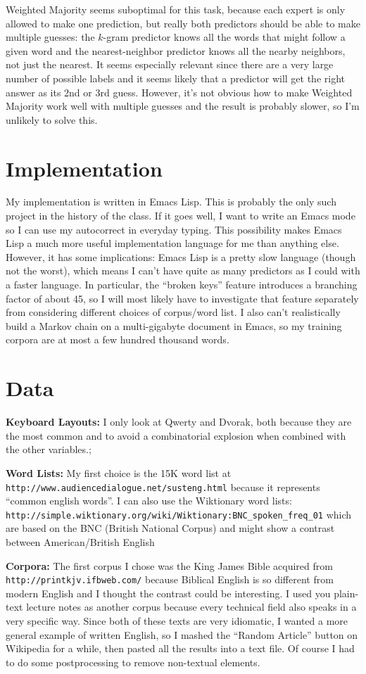 \documentclass[12pt]{article}
\begin{document}
Weighted Majority seems suboptimal for this task, because each expert
is only allowed to make one prediction, but really both predictors
should be able to make multiple guesses: the $k$-gram predictor knows
all the words that might follow a given word and the nearest-neighbor
predictor knows all the nearby neighbors, not just the nearest. It
seems especially relevant since there are a very large number of
possible labels and it seems likely that a predictor will get the
right answer as its 2nd or 3rd guess.  However, it's not obvious how
to make Weighted Majority work well with multiple guesses and the
result is probably slower, so I'm unlikely to solve this.

\section{Implementation}
My implementation is written in Emacs Lisp. This is probably the only
such project in the history of the class. If it goes well, I want to
write an Emacs mode so I can use my autocorrect in everyday
typing. This possibility makes Emacs Lisp a much more useful
implementation language for me than anything else. However, it has
some implications: Emacs Lisp is a pretty slow language (though not
the worst), which means I can't have quite as many predictors as I
could with a faster language. In particular, the ``broken keys''
feature introduces a branching factor of about 45, so I will most
likely have to investigate that feature separately from considering
different choices of corpus/word list. I also can't realistically
build a Markov chain on a multi-gigabyte document in Emacs, so my
training corpora are at most a few hundred thousand words.
\section{Data}
{\bf Keyboard Layouts:} I only look at Qwerty and Dvorak, both because
they are the most common and to avoid a combinatorial explosion when
combined with the other variables.;

{\bf Word Lists:} My first choice is the 15K word list at
\\\verb|http://www.audiencedialogue.net/susteng.html| because it
represents ``common english words''. I can also use the Wiktionary
word lists:
\\\verb|http://simple.wiktionary.org/wiki/Wiktionary:BNC_spoken_freq_01|
which are based on the BNC (British National Corpus) and might show a
contrast between American/British English

{\bf Corpora:} The first corpus I chose was the King James Bible
acquired from \verb|http://printkjv.ifbweb.com/| because Biblical
English is so different from modern English and I thought the contrast
could be interesting.  I used you plain-text lecture notes as another
corpus because every technical field also speaks in a very specific
way.  Since both of these texts are very idiomatic, I wanted a more
general example of written English, so I mashed the ``Random Article''
button on Wikipedia for a while, then pasted all the results into a
text file. Of course I had to do some postprocessing to remove
non-textual elements.
\end{document}
